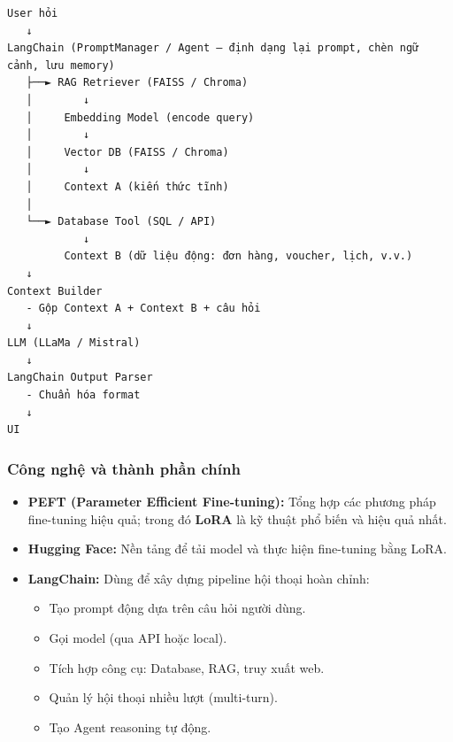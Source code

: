 \begin{verbatim}
User hỏi
   ↓
LangChain (PromptManager / Agent – định dạng lại prompt, chèn ngữ cảnh, lưu memory)
   ├──► RAG Retriever (FAISS / Chroma)
   │        ↓
   │     Embedding Model (encode query)
   │        ↓
   │     Vector DB (FAISS / Chroma)
   │        ↓
   │     Context A (kiến thức tĩnh)
   │
   └──► Database Tool (SQL / API)
            ↓
         Context B (dữ liệu động: đơn hàng, voucher, lịch, v.v.)
   ↓
Context Builder
   - Gộp Context A + Context B + câu hỏi
   ↓
LLM (LLaMa / Mistral)
   ↓
LangChain Output Parser
   - Chuẩn hóa format
   ↓
UI
\end{verbatim}

\subsubsection{Công nghệ và thành phần chính}
\begin{itemize}
    \item \textbf{PEFT (Parameter Efficient Fine-tuning):} Tổng hợp các phương pháp fine-tuning hiệu quả; trong đó \textbf{LoRA} là kỹ thuật phổ biến và hiệu quả nhất.
    \item \textbf{Hugging Face:} Nền tảng để tải model và thực hiện fine-tuning bằng LoRA.
    \item \textbf{LangChain:} Dùng để xây dựng pipeline hội thoại hoàn chỉnh:
    \begin{itemize}
        \item Tạo prompt động dựa trên câu hỏi người dùng.
        \item Gọi model (qua API hoặc local).
        \item Tích hợp công cụ: Database, RAG, truy xuất web.
        \item Quản lý hội thoại nhiều lượt (multi-turn).
        \item Tạo Agent reasoning tự động.
    \end{itemize}
\end{itemize}


